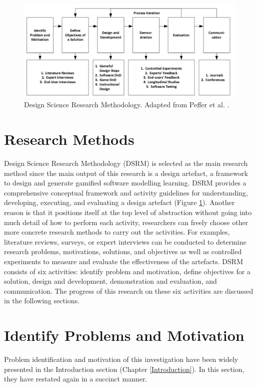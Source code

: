 \documentclass[12pt, a4paper]{report} \usepackage[titletoc]{appendix}
\begin{document}
\begin{figure}[th] \centering \includegraphics[width=\textwidth]{dsrm}
\caption{Design Science Research Methodology. Adapted from Peffer et al. \cite{peffers2007design}.}
\label{dsrm}
\end{figure}

\section{Research Methods}
\label{Research Methods}
Design Science Research Methodology (DSRM) is selected as the main research method since the main output of this research is a design artefact, a framework to design and generate gamified software modelling learning. DSRM provides a comprehensive conceptual framework and activity guidelines for understanding, developing, executing, and evaluating a design artefact (Figure \ref{dsrm}). Another reason is that it positions itself at the top level of abstraction without going into much detail of how to perform each activity, researchers can freely choose other more concrete research methods to carry out the activities. For examples, literature reviews, surveys, or expert interviews can be conducted to determine research problems, motivations, solutions, and objectives as well as controlled experiments to measure and evaluate the effectiveness of the artefacts. DSRM consists of six activities: identify problem and motivation, define objectives for a solution, design and development, demonstration and evaluation, and communication. The progress of this research on these six activities are discussed in the following sections.

\section{Identify Problems and Motivation}
Problem identification and motivation of this investigation have been widely presented in the Introduction section (Chapter \ref{Introduction}). In this section, they have restated again in a succinct manner. 
\end{document}
